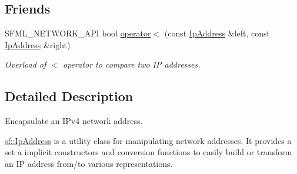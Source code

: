 \subsection*{Friends}
\begin{DoxyCompactItemize}
\item 
S\+F\+M\+L\+\_\+\+N\+E\+T\+W\+O\+R\+K\+\_\+\+A\+PI bool \hyperlink{classsf_1_1_ip_address_a1c4ae6b26e9df765ca57d2715e9a7885}{operator$<$} (const \hyperlink{classsf_1_1_ip_address}{Ip\+Address} \&left, const \hyperlink{classsf_1_1_ip_address}{Ip\+Address} \&right)
\begin{DoxyCompactList}\small\item\em Overload of $<$ operator to compare two IP addresses. \end{DoxyCompactList}\end{DoxyCompactItemize}


\subsection{Detailed Description}
Encapsulate an I\+Pv4 network address. 

\hyperlink{classsf_1_1_ip_address}{sf\+::\+Ip\+Address} is a utility class for manipulating network addresses. It provides a set a implicit constructors and conversion functions to easily build or transform an IP address from/to various representations.

